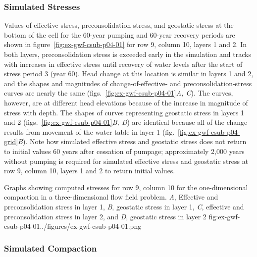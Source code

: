 \subsubsection{Simulated Stresses}

Values of effective stress, preconsolidation stress, and geostatic stress at the bottom of the cell for the 60-year pumping and 60-year recovery periods are shown in figure~\ref{fig:ex-gwf-csub-p04-01} for row 9, column 10, layers 1 and 2. In both layers, preconsolidation stress is exceeded early in the simulation and tracks with increases in effective stress until recovery of water levels after the start of stress period 3 (year 60). Head change at this location is similar in layers 1 and 2, and the shapes and magnitudes of change-of-effective- and preconsolidation-stress curves are nearly the same (figs.~\ref{fig:ex-gwf-csub-p04-01}\textit{A, C}). The curves, however, are at different head elevations because of the increase in magnitude of stress with depth. The shapes of curves representing geostatic stress in layers 1 and 2 (figs.~\ref{fig:ex-gwf-csub-p04-01}\textit{B, D}) are identical because all of the change results from movement of the water table in layer 1 (fig.~\ref{fig:ex-gwf-csub-p04-grid}\textit{B}). Note how simulated effective stress and geostatic stress does not return to initial values 60 years after cessation of pumpage; approximately 2,000 years without pumping is required for simulated effective stress and geostatic stress at row 9, column 10, layers 1 and 2 to return initial values.

\begin{StandardFigure}{
                                     Graphs showing computed stresses for row 9, column 10 for the 
                                     one-dimensional compaction in a three-dimensional flow field problem. 
                                     \textit{A}, Effective and preconsolidation stress in layer 1, \textit{B}, 
                                     geostatic stress in layer 1, \textit{C}, effective and preconsolidation 
                                     stress in layer 2, and \textit{D}, geostatic stress in layer 2
                                     }{fig:ex-gwf-csub-p04-01}{../figures/ex-gwf-csub-p04-01.png}
\end{StandardFigure}                                 

\subsubsection{Simulated Compaction}

